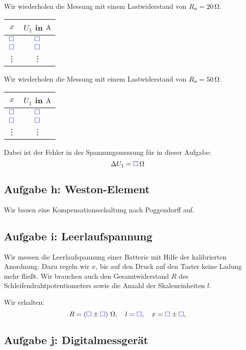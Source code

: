 \documentclass[11pt, ngerman]{article}
\newcommand{\messwert}{\textcolor{blue}{\square}}
\newcommand{\emesswert}{\left(\messwert \pm \messwert \right)}
\begin{document}
Wir wiederholen die Messung mit einem Lastwiderstand von $R_a = \unit[20]
\Omega$.

\begin{center}
	\begin{tabular}{cc}
		$x$ & $U_1$ in $\unit A$ \\
		\hline
		$\messwert$ & $\messwert$ \\
		$\messwert$ & $\messwert$ \\
			 \vdots & \vdots
	\end{tabular}
\end{center}

Wir wiederholen die Messung mit einem Lastwiderstand von $R_a = \unit[50] \Omega$.

\begin{center}
	\begin{tabular}{cc}
		$x$ & $U_1$ in $\unit A$ \\
		\hline
		$\messwert$ & $\messwert$ \\
		$\messwert$ & $\messwert$ \\
			 \vdots & \vdots
	\end{tabular}
\end{center}

Dabei ist der Fehler in der Spannungsmessung für in dieser Aufgabe:
\[ \Delta U_1 = \unit[\messwert] \Omega \]

\subsection{Aufgabe h: Weston-Element}

\label{durchführung-h}

Wir bauen eine Kompensationsschaltung nach Poggendorff auf.

\subsection{Aufgabe i: Leerlaufspannung}

\label{durchführung-i}

Wir messen die Leerlaufspannung einer Batterie mit Hilfe der kalibrierten
Anordnung. Dazu regeln wir $x$, bis auf den Druck auf den Taster keine Ladung
mehr fließt. Wir brauchen auch den Gesamtwiderstand $R$ des
Schleifendrahtpotentiometers sowie die Anzahl der Skaleneinheiten $l$.

Wir erhalten:
\[
	R = \unit[\emesswert]\Omega,
	\quad
	l = \messwert,
	\quad
	x = \messwert \pm \messwert,
\]

\subsection{Aufgabe j: Digitalmessgerät}
\end{document}
